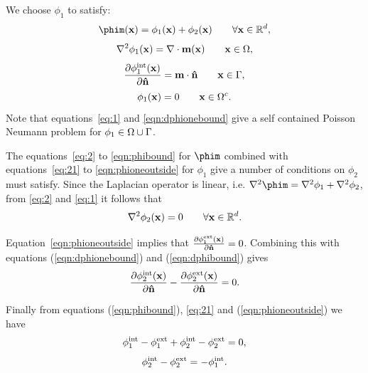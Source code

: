 We choose $\phi_1$ to satisfy:
\begin{equation}
  \phim(\xv) = \phi_1(\xv) + \phi_2(\xv) \qquad \forall \xv \in \fulld,
  \label{eq:21}
\end{equation}
\begin{equation}
  \nabla^2 \phi_1(\mathbf{x}) = \nabla \cdot \mathbf{m}(\mathbf{x}) \qquad \mathbf{x} \in \Omega,
  \label{eq:1}
\end{equation}
\begin{equation}
  \frac{\partial \phi^{\text{int}}_1(\mathbf{x})}{\partial \mathbf{\hat{n}}} = \mathbf{m} \cdot \mathbf{\hat{n}} \qquad \mathbf{x} \in {\Gamma},
  \label{eqn:dphionebound}
\end{equation}
\begin{equation}
  \phi_1(\mathbf{x}) = 0 \qquad \mathbf{x} \in {\Omega^c}.
  \label{eqn:phioneoutside}
\end{equation}
Note that equations~\eqref{eq:1} and \eqref{eqn:dphionebound} give a self contained Poisson Neumann problem for $\phi_1 \in \Omega \cup {\Gamma}$.

The equations~\eqref{eq:2} to \eqref{eqn:phibound} for $\phim$ combined with equations~\eqref{eq:21} to \eqref{eqn:phioneoutside} for $\phi_1$ give a number of conditions on $\phi_2$ must satisfy. Since the Laplacian operator is linear, i.e. $\nabla^2 \phim = \nabla^2 \phi_1 + \nabla^2 \phi_2$, from \eqref{eq:2} and \eqref{eq:1} it follows that
\begin{equation}
  \label{eq:8}
  \nabla^2 \phi_2(\mathbf{x}) = 0 \qquad \forall \mathbf{x} \in {\mathbb{R}^d}.
\end{equation}

Equation~\eqref{eqn:phioneoutside} implies that $\frac{\partial \phi^{\text{ext}}_1(\mathbf{x})}{\partial \mathbf{\hat{n}}} = 0$. Combining this with equations (\ref{eqn:dphionebound}) and (\ref{eqn:dphibound}) gives
\begin{equation}
  \label{eq:5}
  \frac{\partial \phi^{\text{int}}_2(\mathbf{x})}{\partial \mathbf{\hat{n}}} - \frac{\partial \phi^{\text{ext}}_2(\mathbf{x})}{\partial \mathbf{\hat{n}}} = 0.
\end{equation}

Finally from equations (\ref{eqn:phibound}), \eqref{eq:21} and (\ref{eqn:phioneoutside}) we have
\begin{equation*}
  \phi^{\text{int}}_1 - \phi^{\text{ext}}_1 + \phi^{\text{int}}_2 - \phi^{\text{ext}}_2 = 0,
\end{equation*}
\begin{equation}
  \phi^{\text{int}}_2 - \phi^{\text{ext}}_2 = - \phi^{\text{int}}_1.
\label{eq:4}
\end{equation}

